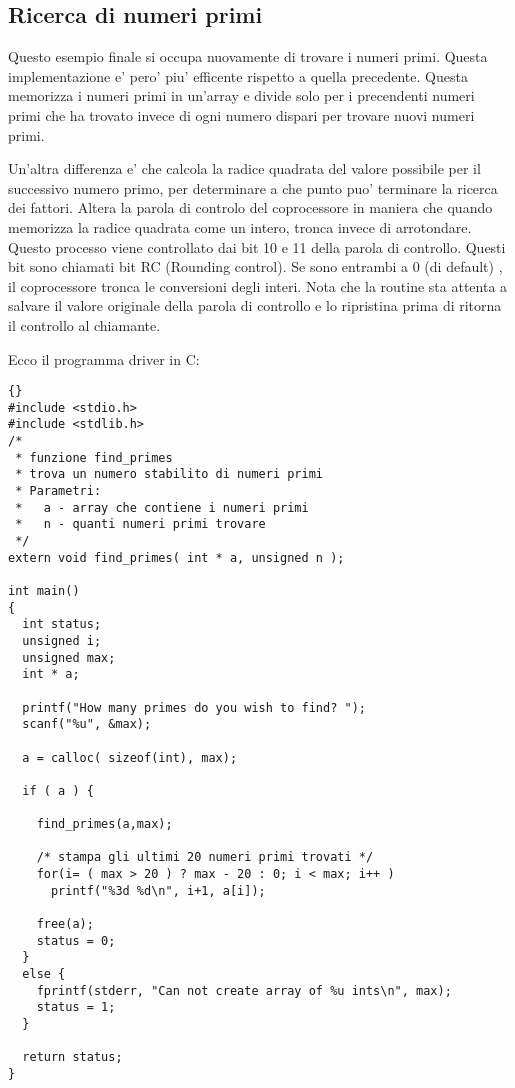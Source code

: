 \subsection{Ricerca di numeri primi}

Questo esempio finale si occupa nuovamente di trovare i numeri primi. Questa
implementazione e' pero' piu' efficente rispetto a quella precedente. Questa
memorizza i numeri primi in un'array e divide solo per i precendenti numeri
primi che ha trovato invece di ogni numero dispari per trovare nuovi numeri
primi.

Un'altra differenza e' che calcola la radice quadrata del valore possibile
per il successivo numero primo, per determinare a che punto puo' terminare
la ricerca dei fattori. Altera la parola di controlo del coprocessore in 
maniera che quando memorizza la radice quadrata come un intero, tronca invece
di arrotondare. Questo processo viene controllato dai bit 10 e 11 della parola
di controllo. Questi bit sono chiamati bit RC (Rounding control). Se sono
entrambi a 0 (di default) , il coprocessore tronca le conversioni degli
interi. Nota che la routine sta attenta a salvare il valore originale della
parola di controllo e lo ripristina prima di ritorna il controllo al
chiamante.

Ecco il programma driver in C:
\begin{lstlisting}{}
#include <stdio.h>
#include <stdlib.h>
/*
 * funzione find_primes
 * trova un numero stabilito di numeri primi
 * Parametri:
 *   a - array che contiene i numeri primi
 *   n - quanti numeri primi trovare
 */
extern void find_primes( int * a, unsigned n );

int main()
{
  int status;
  unsigned i;
  unsigned max;
  int * a;

  printf("How many primes do you wish to find? ");
  scanf("%u", &max);

  a = calloc( sizeof(int), max);

  if ( a ) {

    find_primes(a,max);

    /* stampa gli ultimi 20 numeri primi trovati */
    for(i= ( max > 20 ) ? max - 20 : 0; i < max; i++ )
      printf("%3d %d\n", i+1, a[i]);

    free(a);
    status = 0;
  }
  else {
    fprintf(stderr, "Can not create array of %u ints\n", max);
    status = 1;
  }

  return status;
}
\end{lstlisting}

